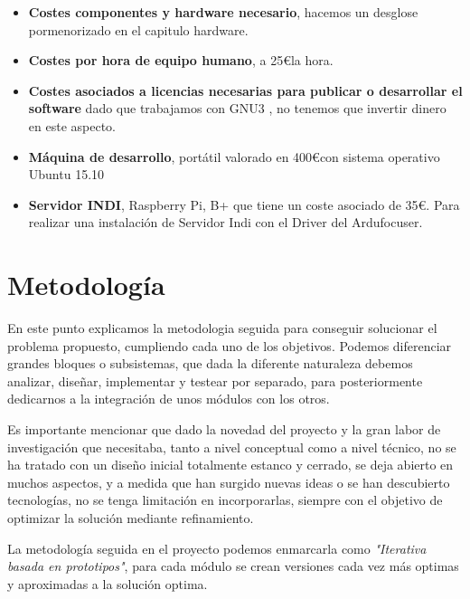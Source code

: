 \begin{itemize}
	
	\item \textbf{Costes componentes y hardware necesario}, hacemos un desglose pormenorizado en el capitulo hardware.
	
	\item \textbf{Costes por hora de equipo humano}, a 25\euro la hora.
	
	\item \textbf{Costes asociados a licencias necesarias para publicar o desarrollar
	el software} dado que trabajamos con GNU3 \cite{GNU3}, no tenemos que invertir dinero en este aspecto.

	\item \textbf{Máquina de desarrollo}, portátil valorado en 400\euro con sistema operativo Ubuntu 15.10
	
	\item \textbf{Servidor INDI}, Raspberry Pi, B+ que tiene un coste asociado de 35\euro. Para realizar una instalación de Servidor Indi con el Driver del Ardufocuser.
 
\end{itemize}

\section{Metodología}

\bigskip
En este punto explicamos la metodologia seguida para conseguir  solucionar el problema propuesto, cumpliendo cada uno de los objetivos. 
Podemos diferenciar grandes bloques o subsistemas, que dada la diferente naturaleza debemos analizar, diseñar, implementar y testear por separado, para posteriormente dedicarnos a la integración de unos módulos con los otros.

\bigskip
Es importante mencionar que dado la novedad del proyecto y la gran labor de investigación que necesitaba, tanto a nivel conceptual como a nivel técnico, no se ha tratado con un diseño inicial totalmente estanco y cerrado, se deja abierto en muchos aspectos, y a medida que han surgido nuevas ideas o se han descubierto tecnologías, no se tenga limitación en incorporarlas, siempre con el objetivo de  optimizar la solución mediante refinamiento.

\bigskip
La metodología seguida en el proyecto podemos enmarcarla como \textit{"Iterativa basada en prototipos"}, para cada módulo se crean versiones 
cada vez más optimas y aproximadas a la solución optima.

